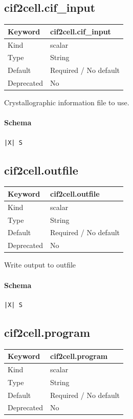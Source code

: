 \documentclass[11pt]{article}
\begin{document}
{{{{{\subsection{cif2cell.cif\_input}
\label{kw:cif2cell-cif-input}
\begin{longtable}{|p{1.5in}|p{4.5in}|}
\hline
Keyword & cif2cell.cif\_input \\
\hline
Kind & scalar \\
\hline
Type & String \\
\hline
Default & Required / No default \\
\hline
Deprecated & No \\
\hline
\end{longtable}
 Crystallographic information file to use.

\paragraph{Schema}
\begin{Verbatim}
|X| S
\end{Verbatim}

\subsection{cif2cell.outfile}
\label{kw:cif2cell-outfile}
\begin{longtable}{|p{1.5in}|p{4.5in}|}
\hline
Keyword & cif2cell.outfile \\
\hline
Kind & scalar \\
\hline
Type & String \\
\hline
Default & Required / No default \\
\hline
Deprecated & No \\
\hline
\end{longtable}
 Write output to outfile

\paragraph{Schema}
\begin{Verbatim}
|X| S
\end{Verbatim}

\subsection{cif2cell.program}
\label{kw:cif2cell-program}
\begin{longtable}{|p{1.5in}|p{4.5in}|}
\hline
Keyword & cif2cell.program \\
\hline
Kind & scalar \\
\hline
Type & String \\
\hline
Default & Required / No default \\
\hline
Deprecated & No \\
\hline
\end{longtable}
}}}}}
\end{document}
